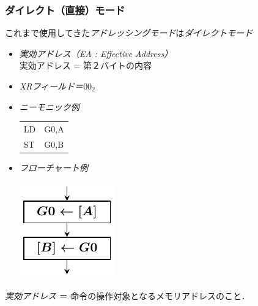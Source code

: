 \documentclass{beamer}                 %
\begin{document}
\begin{frame}
  \frametitle{ダイレクト（直接）モード}
  これまで使用してきた\emph{アドレッシングモード}は\emph{ダイレクトモード}
  \vfill
  \begin{itemize}
  \item \emph{実効アドレス（EA : Effective Address）} \\
    実効アドレス = 第２バイトの内容 \\
    \vfill
  \item \emph{XRフィールド＝$00_2$}
    \vfill
  \item \emph{ニーモニック例} \\
    {\ttfamily\vspace{-0.5cm}\begin{center}
      \begin{tabular}{l l}
        LD & G0,A \\
        ST & G0,B \\
      \end{tabular}
    \end{center}}
    \vfill
  \item \emph{フローチャート例} \\
    \vspace{-0.5cm}\centerline{\includegraphics[scale=0.8]{../Tikz/flowE.pdf}}
  \end{itemize}
  \vfill
  \emph{実効アドレス} ＝ 命令の操作対象となるメモリアドレスのこと．
  \vfill
\end{frame}
\end{document}
